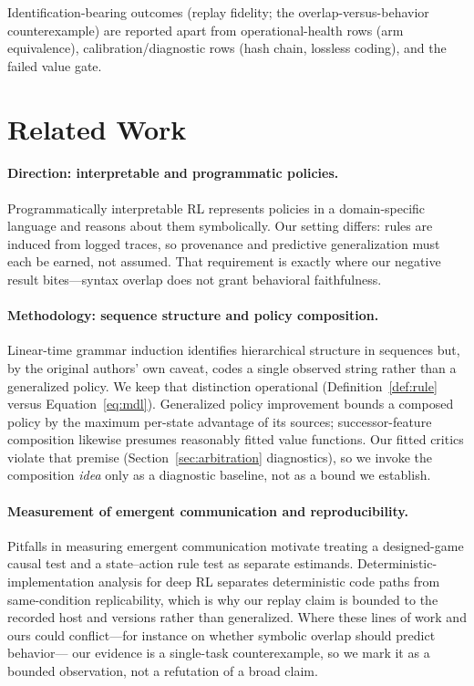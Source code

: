 \documentclass[11pt]{article}
\begin{document}
Identification-bearing outcomes (replay fidelity; the overlap-versus-behavior counterexample) are
reported apart from operational-health rows (arm equivalence), calibration/diagnostic rows (hash
chain, lossless coding), and the failed value gate.

\section{Related Work}
\label{sec:related}

\paragraph{Direction: interpretable and programmatic policies.}
Programmatically interpretable RL represents policies in a domain-specific language and reasons
about them symbolically. Our setting differs: rules are induced from logged traces, so provenance
and predictive generalization must each be earned, not assumed. That requirement is exactly where
our negative result bites---syntax overlap does not grant behavioral faithfulness.

\paragraph{Methodology: sequence structure and policy composition.}
Linear-time grammar induction identifies hierarchical structure in sequences but, by the original
authors' own caveat, codes a single observed string rather than a generalized policy. We keep that
distinction operational (Definition~\ref{def:rule} versus Equation~\eqref{eq:mdl}). Generalized
policy improvement bounds a composed policy by the maximum per-state advantage of its sources;
successor-feature composition likewise presumes reasonably fitted value functions. Our fitted
critics violate that premise (Section~\ref{sec:arbitration} diagnostics), so we invoke the
composition \emph{idea} only as a diagnostic baseline, not as a bound we establish.

\paragraph{Measurement of emergent communication and reproducibility.}
Pitfalls in measuring emergent communication motivate treating a designed-game causal test and a
state--action rule test as separate estimands. Deterministic-implementation analysis for deep RL
separates deterministic code paths from same-condition replicability, which is why our replay
claim is bounded to the recorded host and versions rather than generalized. Where these lines of
work and ours could conflict---for instance on whether symbolic overlap should predict behavior---
our evidence is a single-task counterexample, so we mark it as a bounded observation, not a
refutation of a broad claim.
\end{document}
